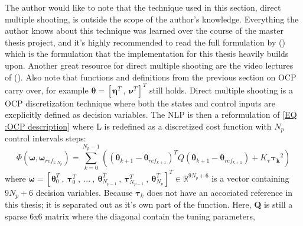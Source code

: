 The author would like to note that the technique used in this section, direct multiple shooting, is outside the scope of the author's knowledge.
Everything the author knows about this technique was learned over the course of the master thesis project, and it's highly recommended to read the full formulation by (\cite{breivik2017mpc})
which is the formulation that the implementation for this thesis heavily builds upon. Another great resource for direct multiple shooting are the video lectures of (\cite{gros2017Lecture}).
Also note that functions and definitions from the previous section on \gls{OCP} carry over, for example $\bm{\theta} = [\bm{\eta}^T \ , \ \bm{\nu}^T]^T$ still holds.\newline
Direct multiple shooting is a \gls{OCP} discretization technique where both the states and control inputs are excplicitly defined as decision variables.
The \gls{NLP} is then a reformulation of \eqref{EQ :OCP description} where L is redefined as a discretized cost function with $N_p$ control intervals steps:
\begin{equation} %
    \Phi(\bm{\omega}, \bm{\omega}_{ref_{1:N_p}}) = 
    \sum_{k=0}^{N_{p}-1} ((\bm{\theta}_{k+1} - \bm{\theta}_{ref_{k+1}})^T Q (\bm{\theta}_{k+1} - \bm{\theta}_{ref_{k+1}}) + K_{\bm{\tau}} \bm{\tau_k}^2)
\end{equation}
where $\bm{\omega} = [\bm{\theta}_0^T \ , \ \bm{\tau}_0^T \ , \ ... \ , \ \bm{\theta}_{N_{p-1}}^T \ , \ \bm{\tau}_{N_{p-1}}^T \ , \ \bm{\theta}_{N_{p}}^T]^T \in \mathbb{R}^{9N_{p}+6}$
is a vector containing $9N_p + 6$ decision variables.%
Because $\bm{\tau}_k$ does not have an accociated reference in this thesis; it is separated out as it's own part of the function.
Here, \textbf{Q} is still a sparse 6x6 matrix where the diagonal contain the tuning parameters,

